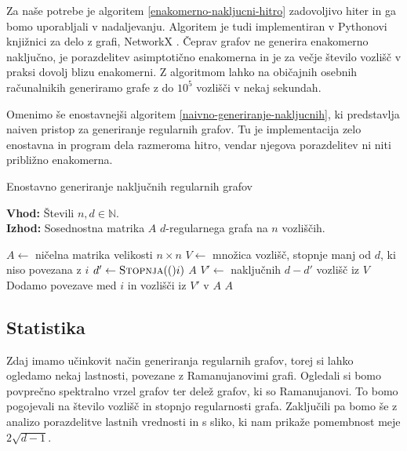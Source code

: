 Za naše potrebe je algoritem \ref{enakomerno-nakljucni-hitro} zadovoljivo hiter in ga bomo uporabljali v nadaljevanju. Algoritem je tudi implementiran v Pythonovi knjižnici za delo z grafi, NetworkX \cite{networkx}. Čeprav grafov ne generira enakomerno naključno, je porazdelitev asimptotično enakomerna in je za večje število vozlišč v praksi dovolj blizu enakomerni. Z algoritmom lahko na običajnih osebnih računalnikih generiramo grafe z do \(10^5\) vozlišči v nekaj sekundah.

Omenimo še enostavnejši algoritem \ref{naivno-generiranje-nakljucnih}, ki predstavlja naiven pristop za generiranje regularnih grafov. Tu je implementacija zelo enostavna in program dela razmeroma hitro, vendar njegova porazdelitev ni niti približno enakomerna.

\begin{algorithm}[H]
    \caption{Enostavno generiranje naključnih regularnih grafov}
    \label{naivno-generiranje-nakljucnih}
    \raggedright
    \textbf{Vhod:} Števili \(n, d \in \mathbb N\). \\
    \textbf{Izhod:} Sosednostna matrika \(A\) \(d\)-regularnega grafa na \(n\) vozliščih.
    \begin{algorithmic}[1]
        \State \(A \gets\) ničelna matrika velikosti \(n \times n\)
        \State \(V \gets \) množica vozlišč, stopnje manj od \(d\), ki niso povezana z \(i\)
        \State \(d' \gets \Call{Stopnja}(i)\)
        \State \Return \(A\)
        \EndIf
        \State \(V' \gets \) naključnih \(d-d'\) vozlišč iz \(V\)
        \State Dodamo povezave med \(i\) in vozlišči iz \(V'\) v \(A\)
        \EndFor
        \State \Return $A$
        \EndFunction
    \end{algorithmic}
\end{algorithm}

\subsection{Statistika}
Zdaj imamo učinkovit način generiranja regularnih grafov, torej si lahko ogledamo nekaj lastnosti, povezane z Ramanujanovimi grafi. Ogledali si bomo povprečno spektralno vrzel grafov ter delež grafov, ki so Ramanujanovi. To bomo pogojevali na število vozlišč in stopnjo regularnosti grafa. Zaključili pa bomo še z analizo porazdelitve lastnih vrednosti in s sliko, ki nam prikaže pomembnost meje \(2\sqrt{d-1}\).

